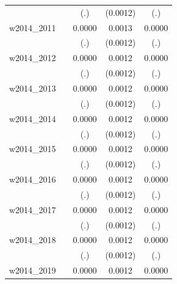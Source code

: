 \begin{table}[htbp]
\begin{tabular}{l*{4}{c}}
            &                     &         (.)         &    (0.0012)         &         (.)         \\
[1em]
w2014\_2011  &                     &      0.0000         &      0.0013         &      0.0000         \\
            &                     &         (.)         &    (0.0012)         &         (.)         \\
[1em]
w2014\_2012  &                     &      0.0000         &      0.0012         &      0.0000         \\
            &                     &         (.)         &    (0.0012)         &         (.)         \\
[1em]
w2014\_2013  &                     &      0.0000         &      0.0012         &      0.0000         \\
            &                     &         (.)         &    (0.0012)         &         (.)         \\
[1em]
w2014\_2014  &                     &      0.0000         &      0.0012         &      0.0000         \\
            &                     &         (.)         &    (0.0012)         &         (.)         \\
[1em]
w2014\_2015  &                     &      0.0000         &      0.0012         &      0.0000         \\
            &                     &         (.)         &    (0.0012)         &         (.)         \\
[1em]
w2014\_2016  &                     &      0.0000         &      0.0012         &      0.0000         \\
            &                     &         (.)         &    (0.0012)         &         (.)         \\
[1em]
w2014\_2017  &                     &      0.0000         &      0.0012         &      0.0000         \\
            &                     &         (.)         &    (0.0012)         &         (.)         \\
[1em]
w2014\_2018  &                     &      0.0000         &      0.0012         &      0.0000         \\
            &                     &         (.)         &    (0.0012)         &         (.)         \\
[1em]
w2014\_2019  &                     &      0.0000         &      0.0012         &      0.0000         \\

\end{tabular}
\end{table}

